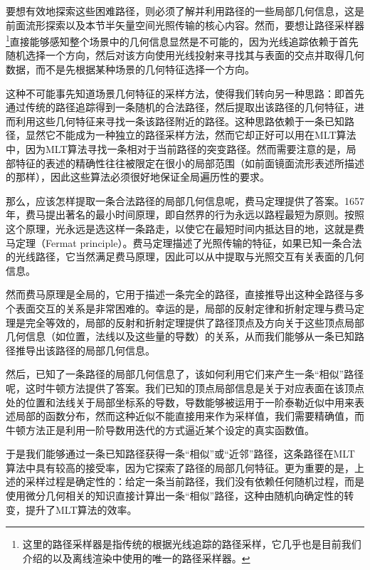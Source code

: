 要想有效地探索这些困难路径，则必须了解并利用路径的一些局部几何信息，这是前面流形探索以及本节半矢量空间光照传输的核心内容。然而，要想让路径采样器\footnote{这里的路径采样器是指传统的根据光线追踪的路径采样，它几乎也是目前我们介绍的以及离线渲染中使用的唯一的路径采样器。}直接能够感知整个场景中的几何信息显然是不可能的，因为光线追踪依赖于首先随机选择一个方向，然后对该方向使用光线投射来寻找其与表面的交点并取得几何数据，而不是先根据某种场景的几何特征选择一个方向。

这种不可能事先知道场景几何特征的采样方法，使得我们转向另一种思路：即首先通过传统的路径追踪得到一条随机的合法路径，然后提取出该路径的几何特征，进而利用这些几何特征来寻找一条该路径附近的路径。这种思路依赖于一条已知路径，显然它不能成为一种独立的路径采样方法，然而它却正好可以用在MLT算法中，因为MLT算法寻找一条相对于当前路径的突变路径。然而需要注意的是，局部特征的表述的精确性往往被限定在很小的局部范围（如前面镜面流形表述所描述的那样），因此这些算法必须很好地保证全局遍历性的要求。

那么，应该怎样提取一条合法路径的局部几何信息呢，费马定理提供了答案。1657年，费马提出著名的最小时间原理，即自然界的行为永远以路程最短为原则。按照这个原理，光永远是选这样一条路走，以使它在最短时间内抵达目的地，这就是费马定理（Fermat principle）。费马定理描述了光照传输的特征，如果已知一条合法的光线路径，它当然满足费马原理，因此可以从中提取与光照交互有关表面的几何信息。

然而费马原理是全局的，它用于描述一条完全的路径，直接推导出这种全路径与多个表面交互的关系是非常困难的。幸运的是，局部的反射定律和折射定理与费马定理是完全等效的，局部的反射和折射定理提供了路径顶点及方向关于这些顶点局部几何信息（如位置，法线以及这些量的导数）的关系，从而我们能够从一条已知路径推导出该路径的局部几何信息。

然后，已知了一条路径的局部几何信息了，该如何利用它们来产生一条“相似”路径呢，这时牛顿方法提供了答案。我们已知的顶点局部信息是关于对应表面在该顶点处的位置和法线关于局部坐标系的导数，导数能够被运用于一阶泰勒近似中用来表述局部的函数分布，然而这种近似不能直接用来作为采样值，我们需要精确值，而牛顿方法正是利用一阶导数用迭代的方式逼近某个设定的真实函数值。

于是我们能够通过一条已知路径获得一条“相似”或“近邻”路径，这条路径在MLT算法中具有较高的接受率，因为它探索了路径的局部几何特征。更为重要的是，上述的采样过程是确定性的：给定一条当前路径，我们没有依赖任何随机过程，而是使用微分几何相关的知识直接计算出一条“相似”路径，这种由随机向确定性的转变，提升了MLT算法的效率。




